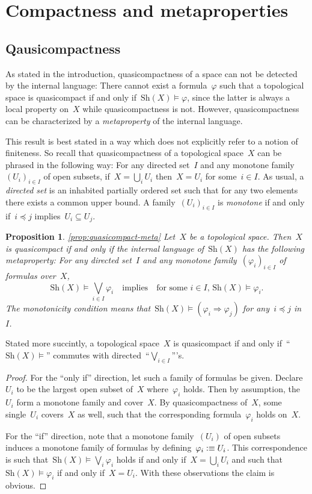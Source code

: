 \documentclass[10pt]{amsart}
\theoremstyle{definition}
\theoremstyle{plain}
\newtheorem{prop}[defn]{Proposition}
\theoremstyle{remark}
\newcommand{\Sh}{\mathrm{Sh}}
\newcommand{\?}{\,{:}\,}
\renewcommand{\_}{\mathpunct{.}\,}
\newcommand{\defequiv}{\vcentcolon\equiv}
\begin{document}
\section{Compactness and metaproperties}
\label{sect:compactness}

\subsection{Qausicompactness}

As stated in the introduction, quasicompactness of a space can not be detected
by the internal language: There cannot exist a formula~$\varphi$ such that a
topological space is quasicompact if and only if~$\Sh(X) \models \varphi$,
since the latter is always a local property on~$X$ while quasicompactness is not.
However, quasicompactness can be characterized by a \emph{metaproperty} of the
internal language.

This result is best stated in a way which does not explicitly refer to a notion
of finiteness. So recall that quasicompactness of a topological space~$X$ can
be phrased in the following way: For any directed set~$I$ and any monotone
family~$(U_i)_{i \in I}$ of open subsets, if~$X = \bigcup_i U_i$ then~$X = U_i$
for some~$i \in I$. As usual, a \emph{directed set} is an inhabited partially
ordered set such that for any two elements there exists a common upper bound.
A family~$(U_i)_{i \in I}$ is \emph{monotone} if and only if~$i \preceq j$
implies~$U_i \subseteq U_j$.

\begin{prop}\ref{prop:quasicompact-meta}
Let~$X$ be a topological space. Then~$X$ is quasicompact if and
only if the internal language of~$\Sh(X)$ has the following metaproperty:
For any directed set~$I$ and any monotone family~$(\varphi_i)_{i \in I}$ of
formulas over~$X$,
\[ \Sh(X) \models \bigvee_{i \in I} \varphi_i
  \quad\text{implies}\quad
  \text{for some~$i \in I$, $\Sh(X) \models \varphi_i$}. \]
The monotonicity condition means that~$\Sh(X) \models (\varphi_i \Rightarrow
\varphi_j)$ for any~$i \preceq j$ in~$I$.
\end{prop}

Stated more succintly, a topological space~$X$ is quasicompact if and only
if~``$\Sh(X) \models$'' commutes with directed~``$\bigvee_{i \in I}$'''s.

\begin{proof}For the ``only if'' direction, let such a family of formulas be
given. Declare~$U_i$ to be the largest open subset of~$X$ where~$\varphi_i$
holds. Then by assumption, the~$U_i$ form a monotone family and cover~$X$. By
quasicompactness of~$X$, some single~$U_i$ covers~$X$ as well, such that the
corresponding formula~$\varphi_i$ holds on~$X$.

For the ``if'' direction, note that a monotone family~$(U_i)$ of open subsets
induces a monotone family of formulas by defining~$\varphi_i \defequiv U_i$. This
correspondence is such that~$\Sh(X) \models \bigvee_i \varphi_i$ holds if and
only if~$X = \bigcup_i U_i$ and such that~$\Sh(X) \models \varphi_i$ if and
only if~$X = U_i$. With these observations the claim is obvious.
\end{proof}
\end{document}
